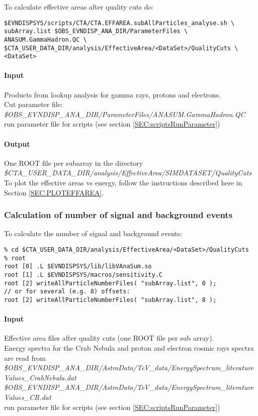 \documentclass[titlepage,a4paper,twoside,11pt]{report}
\begin{document}
To calculate effective areas after quality cuts do:

\begin{lstlisting}
$EVNDISPSYS/scripts/CTA/CTA.EFFAREA.subAllParticles_analyse.sh \
subArray.list $OBS_EVNDISP_ANA_DIR/ParameterFiles \
ANASUM.GammaHadron.QC \
$CTA_USER_DATA_DIR/analysis/EffectiveArea/<DataSet>/QualityCuts \
<DataSet> 
\end{lstlisting}

\paragraph{Input} 
Products from lookup analysis for gamma rays, protons and electrons. \\
Cut parameter file: \\
{\it \$OBS\_EVNDISP\_ANA\_DIR/ParameterFiles/ANASUM.GammaHadron.QC}\\
run parameter file for scripts (see section \ref{SEC:scriptsRunParameter})

\paragraph{Output}

One ROOT file per subarray in the directory  \\
{\it \$CTA\_USER\_DATA\_DIR/analysis/EffectiveArea/SIMDATASET/QualityCuts} \\
To plot the effective areas vs energy, follow the instructions described here in Section \ref{SEC.PLOTEFFAREA}.

\subsubsection{Calculation of number of signal and background events}

To calculate the number of signal and background events:

\begin{lstlisting}
% cd $CTA_USER_DATA_DIR/analysis/EffectiveArea/<DataSet>/QualityCuts
% root 
root [0] .L $EVNDISPSYS/lib/libVAnaSum.so
root [1] .L $EVNDISPSYS/macros/sensitivity.C
root [2] writeAllParticleNumberFiles( "subArray.list", 0 );
// or for several (e.g. 8) offsets:
root [2] writeAllParticleNumberFiles( "subArray.list", 8 );
\end{lstlisting}

\paragraph{Input}
Effective area files after quality cuts (one ROOT file per sub array). \\
Energy spectra for the Crab Nebula and proton and electron cosmic rays spectra are read from \\
{\it \$OBS\_EVNDISP\_ANA\_DIR/AstroData/TeV\_data/EnergySpectrum\_literatureValues\_CrabNebula.dat} \\
{\it \$OBS\_EVNDISP\_ANA\_DIR/AstroData/TeV\_data/EnergySpectrum\_literatureValues\_CR.dat} \\
run parameter file for scripts (see section \ref{SEC:scriptsRunParameter})
\end{document}
